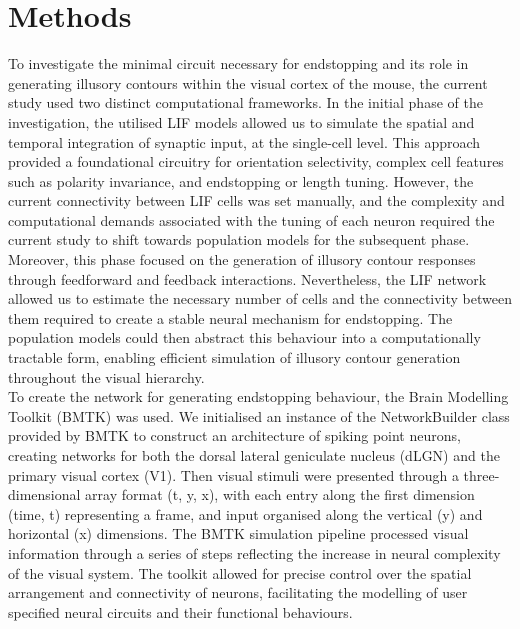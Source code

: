\documentclass[12pt]{article}
\begin{document}
\newpage
\section*{Methods}
To investigate the minimal circuit necessary for endstopping and its role in generating illusory contours within the visual cortex of the mouse, the current study used two distinct computational frameworks. In the initial phase of the investigation, the utilised LIF models allowed us to simulate the spatial and temporal integration of synaptic input, at the single-cell level. This approach provided a foundational circuitry for orientation selectivity, complex cell features such as polarity invariance, and endstopping or length tuning. However, the current connectivity between LIF cells was set manually, and the complexity and computational demands associated with the tuning of each neuron required the current study to shift towards population models for the subsequent phase. Moreover, this phase focused on the generation of illusory contour responses through feedforward and feedback interactions. Nevertheless, the LIF network allowed us to estimate the necessary number of cells and the connectivity between them required to create a stable neural mechanism for endstopping. The population models could then abstract this behaviour into a computationally tractable form, enabling efficient simulation of illusory contour generation throughout the visual hierarchy. 
\\
To create the network for generating endstopping behaviour, the Brain Modelling Toolkit (BMTK) was used. We initialised an instance of the NetworkBuilder class provided by BMTK to construct an architecture of spiking point neurons, creating networks for both the dorsal lateral geniculate nucleus (dLGN) and the primary visual cortex (V1). Then visual stimuli were presented through a three-dimensional array format (t, y, x), with each entry along the first dimension (time, t) representing a frame, and input organised along the vertical (y) and horizontal (x) dimensions. The BMTK simulation pipeline processed visual information through a series of steps reflecting the increase in neural complexity of the visual system. The toolkit allowed for precise control over the spatial arrangement and connectivity of neurons, facilitating the modelling of user specified neural circuits and their functional behaviours. \\
\end{document}
